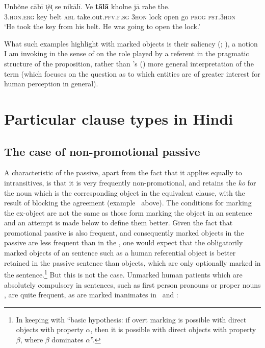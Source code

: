 \documentclass[output=paper]{LSP/langsci}
\begin{document}
\ex \label{10-mo-ex:17d}
\gll Unhõne cābī t̩ẽt̩ se nikālī. Ve \textbf{tālā} kholne jā rahe the.\\
 3.\textsc{hon.erg} key belt \textsc{abl} take.out.\textsc{pfv.f.sg} \textsc{3hon} lock open go \textsc{prog} \textsc{pst.3hon}\\
\glt `He took the key from his belt. He was going to open the lock.’
\z
\z

What such examples highlight with marked objects is their saliency (\citealt[155]{Croft1991Syntactic}; \citealt{Haudeetal2012Saillance}), a notion I am invoking in the sense of \citet[14–15, 57]{Dalrympleetal2011Objects} on the role played by a referent in the pragmatic structure of the proposition, rather than \citeauthor{Naess2004What}’s (\citeyear{Naess2004What}) more general interpretation of the term (which focuses on the question as to which entities are of greater interest for human perception in general).


\section{Particular clause types in Hindi} \label{10-mo-sec:3}

\subsection{The case of non-promotional passive} \label{10-mo-sec:3.1}

A characteristic of the  passive, apart from the fact that it applies equally to intransitives, is that it is very frequently non-promotional, and retains the  \textit{ko} for the noun which is the corresponding object in the equivalent  clause, with the result of blocking the agreement (\cf example~ above). The conditions for marking the ex-object are not the same as those form marking the object in an  sentence and an attempt is made below to define them better. Given the fact that promotional passive is also frequent, and consequently marked objects in the passive are less frequent than in the , one would expect that the obligatorily marked objects of an  sentence such as a human referential object is better retained in the passive sentence than  objects, which are only optionally marked in the  sentence.\footnote{In keeping with  “basic hypothesis: if overt marking is possible with direct objects with property $\alpha $, then it is possible with direct objects with property $\beta $, where $\beta $ dominates $\alpha $”.} But this is not the case. Unmarked human patients which are absolutely compulsory in  sentences, such as first person pronouns  or proper nouns , are quite frequent, as are marked inanimates in~ and :
\end{document}
